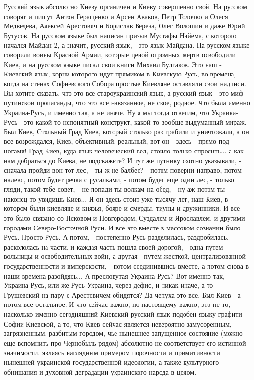 Русский язык абсолютно Киеву органичен и Киеву совершенно свой. На русском
говорят и пишут Антон Геращенко и Арсен Аваков, Петр Толочко и Олеся Медведева,
Алексей Арестович и Борислав Береза, Олег Волошин и даже Юрий Бутусов. На
русском языке был написан призыв Мустафы Найема, с которого начался Майдан-2, а
значит, русский язык, - это язык Майдана.  На русском языке говорили воины
Красной Армии, которые ценой огромных жертв освободили Киев, и на русском языке
писал свои книги Михаил Булгаков. Это наш - Киевский язык, корни которого идут
прямиком в Киевскую Русь, во времена, когда на стенах Софиевского Собора
простые Киевляне оставляли свои надписи. Вы хотите сказать, что это все
староукраинский язык, а русский язык - это миф путинской пропаганды, что это
все навязанное, не свое, родное. Что была именно Украина-Русь, и именно так, а
не иначе.  Ну а мы тогда ответим, что Украина-Русь - это какой-то непонятный
конструкт, какой-то вообще выдуманный мираж. Был Киев, Стольный Град Киев,
который столько раз грабили и уничтожали, а он все возрождался, Киев,
объективный, реальный, вот он - здесь - прямо под ногами! Град Киев, куда язык
человеческий вел, стоило только спросить...  а как нам добраться до Киева, не
подскажете? И тут же путнику охотно указывали, - сначала пройди вон тот лес, -
ты ж не балбес? - потом поверни направо, потом - налево, потом будет речка с
русалками, - потом будет еще один лес, - только гляди, такой тебе совет, - не
попади ты волкам на обед, - ну аж потом ты наконец-то увидишь Киев...  И он
здесь стоит уже тысячу лет, наш Киев, в котором были киевляне и князья, бояре и
смерды, тиуны и дружинники. И все это было связано со Псковом и Новгородом,
Суздалем и Ярославлем, и другими городами Северо-Восточной Руси.  И все это
вместе в массовом сознании было Русь. Просто Русь. А потом, - постепенно Русь
разделилась, раздробилась, раскололась на части, и каждая часть пошла своей
дорогой, - одна путем вольницы и освободительных войн, а другая - путем
жесткой, централизованной государственности и имперскости, - потом соединившись
вместе, а потом снова в наши времена разойдясь... А пресловутая Украина-Русь?
Вот именно так, Украина-Русь, или же Русь-Украина, через дефис, и никак иначе,
а то Грушевский на пару с Арестовичем обидятся?  Да чепуха это все. Был Киев -
а потом все остальное. И что сейчас важно, по-настоящему важно, это не то,
насколько именно сегодняшний Киевский русский язык подобен языку графити Софии
Киевской, а то, что Киев сейчас является невероятно замусоренным, загрязненным,
разбитым городом, чье нынешнее запущенное состояние (можно еще вспомнить про
Чернобыль рядом) абсолютно не соответствует его истинной значимости, являясь
наглядным примером порочности и примитивности нынешней украинской
государственной идеологии, а также культурного обнищания и духовной деградации
украинского народа в целом.

